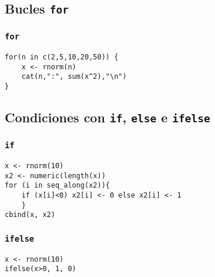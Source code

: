 \documentclass[xcolor={usenames,svgnames,dvipsnames}]{beamer}
\begin{document}
\subsection{Bucles \texttt{for}}
\label{sec-6-1}
\begin{frame}[fragile]
\frametitle{\texttt{for}}
\label{sec-6-1-1}


\lstset{language=R}
\begin{lstlisting}
for(n in c(2,5,10,20,50)) {
    x <- rnorm(n)
    cat(n,":", sum(x^2),"\n")
}
\end{lstlisting}
\end{frame}
\subsection{Condiciones con \texttt{if}, \texttt{else} e \texttt{ifelse}}
\label{sec-6-2}
\begin{frame}[fragile]
\frametitle{\texttt{if}}
\label{sec-6-2-1}


\lstset{language=R}
\begin{lstlisting}
x <- rnorm(10)
x2 <- numeric(length(x))
for (i in seq_along(x2)){
    if (x[i]<0) x2[i] <- 0 else x2[i] <- 1
    }
cbind(x, x2)
\end{lstlisting}
\end{frame}
\begin{frame}[fragile]
\frametitle{\texttt{ifelse}}
\label{sec-6-2-2}


\lstset{language=R}
\begin{lstlisting}
x <- rnorm(10)
ifelse(x>0, 1, 0)
\end{lstlisting}
\end{frame}
\end{document}
